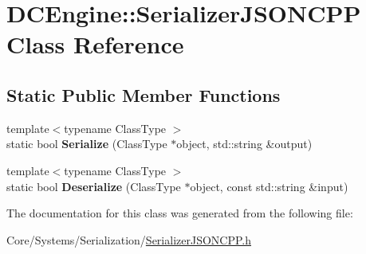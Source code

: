 \hypertarget{classDCEngine_1_1SerializerJSONCPP}{\section{D\-C\-Engine\-:\-:Serializer\-J\-S\-O\-N\-C\-P\-P Class Reference}
\label{classDCEngine_1_1SerializerJSONCPP}
}
\subsection*{Static Public Member Functions}
\begin{DoxyCompactItemize}
\item 
\hypertarget{classDCEngine_1_1SerializerJSONCPP_a9e55ced36a7f5c1911868beb910826fc}{{\footnotesize template$<$typename Class\-Type $>$ }\\static bool {\bfseries Serialize} (Class\-Type $\ast$object, std\-::string \&output)}\label{classDCEngine_1_1SerializerJSONCPP_a9e55ced36a7f5c1911868beb910826fc}

\item 
\hypertarget{classDCEngine_1_1SerializerJSONCPP_ac601400501fef55640c6e9fec786b5a2}{{\footnotesize template$<$typename Class\-Type $>$ }\\static bool {\bfseries Deserialize} (Class\-Type $\ast$object, const std\-::string \&input)}\label{classDCEngine_1_1SerializerJSONCPP_ac601400501fef55640c6e9fec786b5a2}

\end{DoxyCompactItemize}


The documentation for this class was generated from the following file\-:\begin{DoxyCompactItemize}
\item 
Core/\-Systems/\-Serialization/\hyperlink{SerializerJSONCPP_8h}{Serializer\-J\-S\-O\-N\-C\-P\-P.\-h}\end{DoxyCompactItemize}
